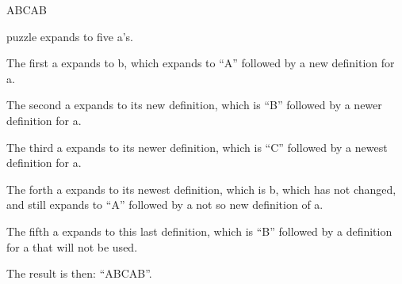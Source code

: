 \def\a{\b}
\def\b{A\def\a{B\def\a{C\def\a{\b}}}}
\def\puzzle{\a\a\a\a\a}

\puzzle

puzzle expands to five a's.

The first a expands to b, which expands to ``A'' followed by a new definition for a.

The second a expands to its new definition, which is ``B'' followed by a newer definition for a.

The third a expands to its newer definition, which is ``C'' followed by a newest definition for a.

The forth a expands to its newest definition, which is b, which has not changed, and still
expands to ``A'' followed by a not so new definition of a.

The fifth a expands to this last definition, which is ``B'' followed by a definition for a that
will not be used.

The result is then: ``ABCAB''.

\bye

